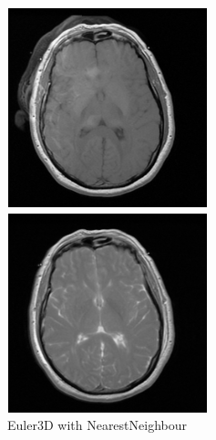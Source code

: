 \documentclass[11pt,english]{article}
\begin{document}
    \begin{figure}[h!]
        \centering
        \begin{minipage}[b]{0.3\textwidth}
            \includegraphics[width = \textwidth]{images/eulerNN.PNG}
            \caption{Euler3D with NearestNeighbour}
            \label{fig:eulerNN}
          \end{minipage}
        \begin{minipage}[b]{0.3\textwidth}
          \includegraphics[width = \textwidth]{images/versorGaussian.PNG}

\end{minipage}
\end{figure}
\end{document}

